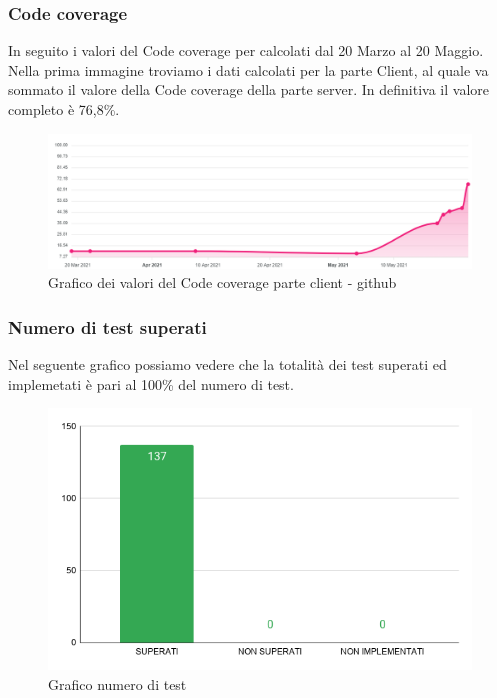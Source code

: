 \subsubsection{Code coverage}
 In seguito i valori del Code coverage per calcolati dal 20 Marzo al 20 Maggio.
 Nella prima immagine troviamo i dati calcolati per la parte Client, al quale va sommato il valore della Code coverage della parte server.
 In definitiva il valore completo è 76,8\%.
    \begin{figure}[H]
        \centering
        \includegraphics[width=16 cm]{source/sections/images/CodeCoverage.png}
        \caption{Grafico dei valori del Code coverage parte client - github}
    \end{figure}


\subsubsection{Numero di test superati}
Nel seguente grafico possiamo vedere che la totalità dei test superati ed implemetati è pari al 100\% del numero di test.
    \begin{figure}[H]
        \centering
        \includegraphics[width=10 cm]{source/sections/images/num-test.png}
        \caption{Grafico numero di test}
    \end{figure}
